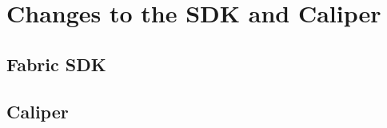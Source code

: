 \chapter{Changes to the SDK and Caliper}\label{chapter:sdks}
\section{Fabric SDK}\label{chapter:sdk}
\section{Caliper}\label{chapter:caliper}
